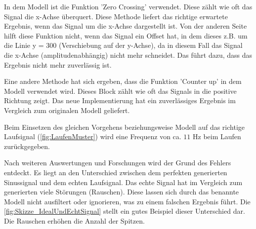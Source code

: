 In dem Modell ist die Funktion 'Zero Crossing' verwendet. Diese zählt wie oft das Signal die x-Achse überquert. Diese Methode liefert das richtige erwartete Ergebnis, wenn das Signal um die x-Achse dargestellt ist. Von der anderen Seite hilft diese Funktion nicht, wenn das Signal ein Offset hat, in dem dieses z.B. um die Linie y = 300 (Verschiebung auf der y-Achse), da in diesem Fall das Signal die x-Achse (amplitudenabhängig) nicht mehr schneidet. Das führt dazu, dass das Ergebnis nicht mehr zuverlässig ist.

Eine andere Methode hat sich ergeben, dass die Funktion 'Counter up' in dem Modell verwendet wird. Dieses Block zählt wie oft das Signals in die positive Richtung zeigt. Das neue Implementierung hat ein zuverlässiges Ergebnis im Vergleich zum originalen Modell geliefert.

Beim Einsetzen des gleichen Vorgehens beziehungsweise Modell auf das richtige Laufsignal (\autoref{fig:LaufenMuster}) wird eine Frequenz von ca. $11$ Hz beim Laufen zurückgegeben.

Nach weiteren Auswertungen und Forschungen wird der Grund des Fehlers entdeckt. Es liegt an den Unterschied zwischen dem perfekten generierten Sinussignal und dem echten Laufsignal. Das echte Signal hat im Vergleich zum generierten viele Störungen (Rauschen). Diese lassen sich durch das benannte Modell nicht ausfiltert oder ignorieren, was zu einem falschen Ergebnis führt. Die \autoref{fig:Skizze_IdealUndEchtSignal} stellt ein gutes Beispiel dieser Unterschied dar. Die Rauschen erhöhen die Anzahl der Spitzen.




